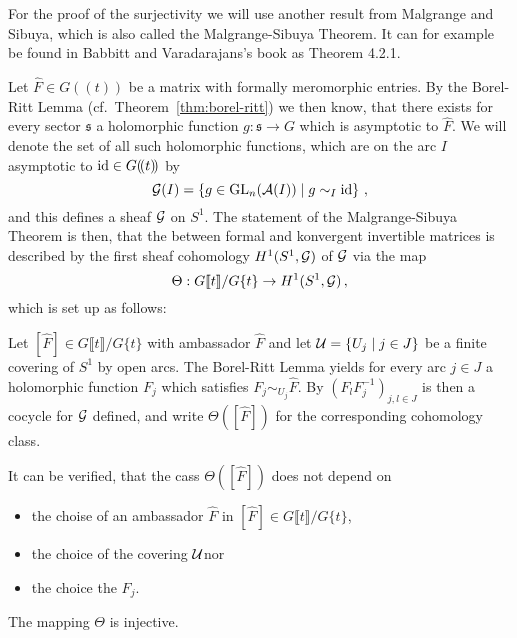 For the proof of the surjectivity we will use another result from Malgrange and
Sibuya, which is also called the Malgrange-Sibuya Theorem. It can for example
be found in Babbitt and Varadarajans's book \cite[65ff]{babbitt1989local} as
Theorem 4.2.1.

Let $\hat F\in G(\!(t)\!)$ be a matrix with formally meromorphic entries. By
the Borel-Ritt Lemma (cf.\ Theorem~\ref{thm:borel-ritt}) we then know, that
there exists for every sector $\mathfrak{s}$ a holomorphic function
$g:\mathfrak{s}\to G$ which is asymptotic to $\hat F$.
We will denote the set of all such holomorphic functions, which are on
the arc $I$ asymptotic to $\operatorname{id}\in G(\!(t)\!)$ by
\[
  \mathcal{G}(I)=\left\{g\in\operatorname{GL}_n(\mathcal{A}(I))\mid g\sim_I\operatorname{id}\right\}\,,
\]
and this defines a sheaf $\mathcal{G}$ on $S^1$.
The statement of the Malgrange-Sibuya Theorem is then, that the
 between formal and konvergent invertible matrices is
described by the first sheaf cohomology $H^1(S^1,\mathcal{G})$ of
$\mathcal{G}$ via the map
\[
  \Theta: G\llbracket t\rrbracket/G\{t\}\to H^1(S^1,\mathcal{G}) \,,
\]
which is set up as follows:
\begin{einr}
  Let $[\hat F]\in G\llbracket t\rrbracket/G\{t\}$ with ambassador $\hat F$ and
  let $\mathcal{U}=\{U_j\mid j\in J\}$ be a finite covering of $S^1$ by open arcs.
  The Borel-Ritt Lemma yields for every arc $j\in J$ a holomorphic function
  $F_j$ which satisfies $F_j\sim_{U_j}\hat F$.
  By $(F_lF_j^{-1})_{j,l\in J}$ is then a cocycle for $\mathcal{G}$ defined,
  and write $\Theta([\hat F])$ for the corresponding cohomology class.
\end{einr}
It can be verified, that the cass $\Theta([\hat F])$ does not depend on
\begin{itemize}
  \item the choise of an ambassador $\hat F$ in
    $[\hat F]\in G\llbracket t\rrbracket/G\{t\}$\PROBLEM[proof!],
  \item the choice of the covering $\mathcal{U}$\PROBLEM[proof!] nor
  \item the choice the $F_j$\PROBLEM[proof!].
\end{itemize}
\begin{lem}
  The mapping $\Theta$ is injective.
\end{lem}
